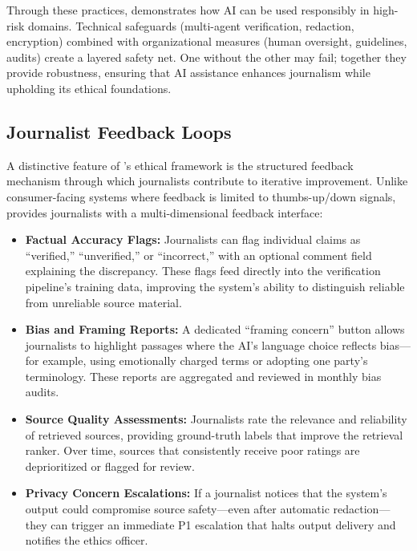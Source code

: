 Through these practices, \ishtar{} demonstrates how AI can be used responsibly in high-risk domains. Technical safeguards (multi-agent verification, redaction, encryption) combined with organizational measures (human oversight, guidelines, audits) create a layered safety net. One without the other may fail; together they provide robustness, ensuring that AI assistance enhances journalism while upholding its ethical foundations.

\subsection{Journalist Feedback Loops}\label{sec:ch11_ishtar_feedback}

A distinctive feature of \ishtar{}'s ethical framework is the structured feedback mechanism through which journalists contribute to iterative improvement. Unlike consumer-facing systems where feedback is limited to thumbs-up/down signals, \ishtar{} provides journalists with a multi-dimensional feedback interface:

\begin{itemize}
    \item \textbf{Factual Accuracy Flags:} Journalists can flag individual claims as ``verified,'' ``unverified,'' or ``incorrect,'' with an optional comment field explaining the discrepancy. These flags feed directly into the verification pipeline's training data, improving the system's ability to distinguish reliable from unreliable source material.
    \item \textbf{Bias and Framing Reports:} A dedicated ``framing concern'' button allows journalists to highlight passages where the AI's language choice reflects bias---for example, using emotionally charged terms or adopting one party's terminology. These reports are aggregated and reviewed in monthly bias audits.
    \item \textbf{Source Quality Assessments:} Journalists rate the relevance and reliability of retrieved sources, providing ground-truth labels that improve the retrieval ranker. Over time, sources that consistently receive poor ratings are deprioritized or flagged for review.
    \item \textbf{Privacy Concern Escalations:} If a journalist notices that the system's output could compromise source safety---even after automatic redaction---they can trigger an immediate P1 escalation that halts output delivery and notifies the ethics officer.
\end{itemize}

